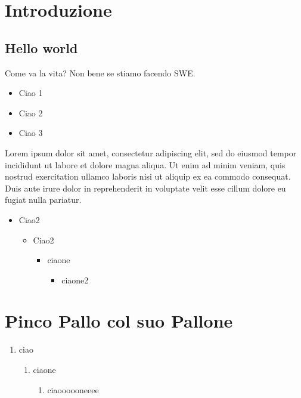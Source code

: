 \section{Introduzione}

\subsection{Hello world}

Come va la vita? Non bene se stiamo facendo SWE.

\begin{itemize}
	\item Ciao 1
	\item Ciao 2
	\item Ciao 3
\end{itemize}

Lorem ipsum dolor sit amet, consectetur adipiscing elit, sed do eiusmod tempor incididunt ut labore et dolore magna aliqua. Ut enim ad minim veniam, quis nostrud exercitation ullamco laboris nisi ut aliquip ex ea commodo consequat. Duis aute irure dolor in reprehenderit in voluptate velit esse cillum dolore eu fugiat nulla pariatur. 


\begin{itemize}
	\item Ciao2
	\begin{itemize}
		\item Ciao2
		\begin{itemize}
			\item ciaone
			\begin{itemize}
				\item ciaone2
			\end{itemize}
		\end{itemize}
	\end{itemize}
\end{itemize}


\section{Pinco Pallo col suo Pallone}

\begin{enumerate}
	\item ciao
	\begin{enumerate}
		\item ciaone
		\begin{enumerate}
			\item ciaoooooneeee
		\end{enumerate}
	\end{enumerate}
\end{enumerate}

